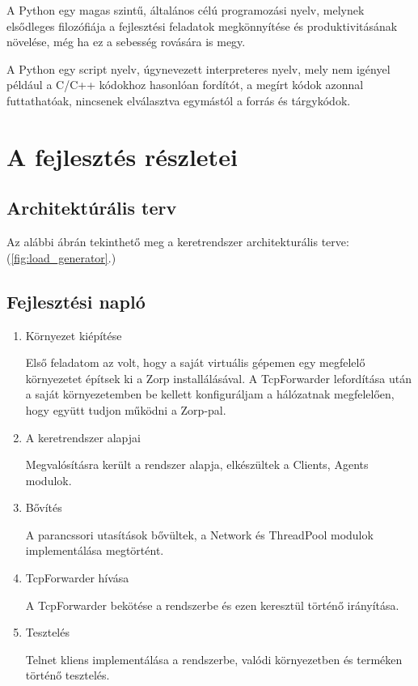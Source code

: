 \documentclass[a4paper,12pt,oneside]{report}
\begin{document}
A Python egy magas szintű, általános célú programozási nyelv, melynek elsődleges filozófiája a fejlesztési feladatok megkönnyítése és produktivitásának növelése, még ha ez a sebesség rovására is megy.

A Python egy script nyelv, úgynevezett interpreteres nyelv, mely nem igényel például a C/C++ kódokhoz hasonlóan fordítót, a megírt kódok azonnal futtathatóak, nincsenek elválasztva egymástól a forrás és tárgykódok.

\section{A fejlesztés részletei}

\subsection{Architektúrális terv}

Az alábbi ábrán tekinthető meg a keretrendszer architekturális terve: (\ref{fig:load_generator}.)

\subsection{Fejlesztési napló}
\begin{enumerate}
	\itemsep0em
		\item Környezet kiépítése
		
			Első feladatom az volt, hogy a saját virtuális gépemen egy megfelelő környezetet építsek ki a Zorp installálásával. A TcpForwarder lefordítása után a saját környezetemben be kellett konfiguráljam a hálózatnak megfelelően, hogy együtt tudjon működni a Zorp-pal.
			
		\item A keretrendszer alapjai
		
		Megvalósításra került a rendszer alapja, elkészültek a Clients, Agents modulok.
		 
		\item Bővítés
		
		A parancssori utasítások bővültek, a Network és ThreadPool modulok implementálása megtörtént.
		
		\item TcpForwarder hívása
		
		A TcpForwarder bekötése a rendszerbe és ezen keresztül történő irányítása.
		
		\item Tesztelés
		
		Telnet kliens implementálása a rendszerbe, valódi környezetben és terméken történő tesztelés.
		
\end{enumerate}
\end{document}
